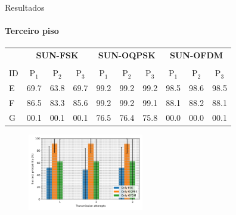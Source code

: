 \documentclass[c]{beamer}
\begin{document}
\begin{darkframes}
  \begin{frame}{Resultados}
    \framesubtitle{Terceiro piso}
    \begin{table}[!b]
      \centering
      {\carlitoTLF %
        \begin{tabularx}{\textwidth}{Xccccccccc}
              & \multicolumn{3}{c|}{\textbf{SUN-FSK}} & \multicolumn{3}{c|}{\textbf{SUN-OQPSK}} & \multicolumn{3}{c}{\textbf{SUN-OFDM}}                                                             \\ \cline{2-10}                                                       \\
          ID  & {P$_1$}                               & {P$_2$}                                 & {P$_3$}                               & {P$_1$} & {P$_2$} & {P$_3$} & {P$_1$} & {P$_2$} & {P$_3$} \\ \hline
          \toprule
          {E} & 69.7                                  & 63.8                                    & 69.7                                  & 99.2    & 99.2    & 99.2    & 98.5    & 98.6    & 98.5    \\ \hline
          {F} & 86.5                                  & 83.3                                    & 85.6                                  & 99.2    & 99.2    & 99.1    & 88.1    & 88.2    & 88.1    \\ \hline
          {G} & 00.1                                  & 00.1                                    & 00.1                                  & 76.5    & 76.4    & 75.8    & 00.0    & 00.0    & 00.1    \\ \hline
        \end{tabularx}}
    \end{table}
    \begin{figure}
      \centering
      \includegraphics[width=0.45\textwidth]{resources/mod_3_floor.png}
    \end{figure}
  \end{frame}


\end{darkframes}
\end{document}
